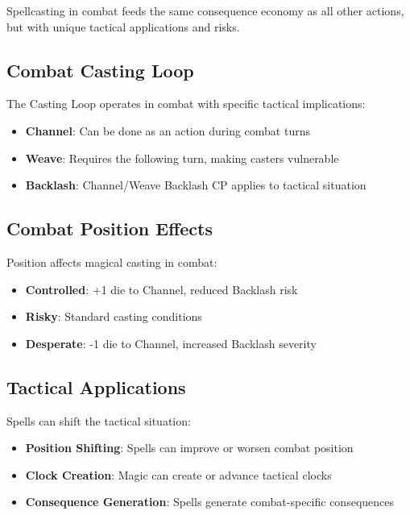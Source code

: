 Spellcasting in combat feeds the same consequence economy as all other actions, but with unique tactical applications and risks.

\subsection*{Combat Casting Loop}

The Casting Loop operates in combat with specific tactical implications:

\begin{itemize}
    \item \textbf{Channel}: Can be done as an action during combat turns
    \item \textbf{Weave}: Requires the following turn, making casters vulnerable
    \item \textbf{Backlash}: Channel/Weave Backlash CP applies to tactical situation
\end{itemize}

\subsection*{Combat Position Effects}

Position affects magical casting in combat:

\begin{itemize}
    \item \textbf{Controlled}: +1 die to Channel, reduced Backlash risk
    \item \textbf{Risky}: Standard casting conditions
    \item \textbf{Desperate}: -1 die to Channel, increased Backlash severity
\end{itemize}

\subsection*{Tactical Applications}

Spells can shift the tactical situation:

\begin{itemize}
    \item \textbf{Position Shifting}: Spells can improve or worsen combat position
    \item \textbf{Clock Creation}: Magic can create or advance tactical clocks
    \item \textbf{Consequence Generation}: Spells generate combat-specific consequences
\end{itemize}

